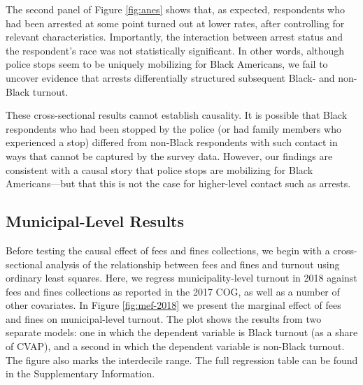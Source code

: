 \documentclass[
  12pt,
]{article}
\begin{document}
The second panel of Figure \ref{fig:anes} shows that, as expected, respondents who had been arrested at some point turned out at lower rates, after controlling for relevant characteristics. Importantly, the interaction between arrest status and the respondent's race was not statistically significant. In other words, although police stops seem to be uniquely mobilizing for Black Americans, we fail to uncover evidence that arrests differentially structured subsequent Black- and non-Black turnout.

These cross-sectional results cannot establish causality. It is possible that Black respondents who had been stopped by the police (or had family members who experienced a stop) differed from non-Black respondents with such contact in ways that cannot be captured by the survey data. However, our findings are consistent with a causal story that police stops are mobilizing for Black Americans---but that this is not the case for higher-level contact such as arrests.

\hypertarget{municipal-level-results}{%
\subsection*{Municipal-Level Results}\label{municipal-level-results}}

Before testing the causal effect of fees and fines collections, we begin with a cross-sectional analysis of the relationship between fees and fines and turnout using ordinary least squares. Here, we regress municipality-level turnout in 2018 against fees and fines collections as reported in the 2017 COG, as well as a number of other covariates. In Figure \ref{fig:mef-2018} we present the marginal effect of fees and fines on municipal-level turnout. The plot shows the results from two separate models: one in which the dependent variable is Black turnout (as a share of CVAP), and a second in which the dependent variable is non-Black turnout. The figure also marks the interdecile range. The full regression table can be found in the Supplementary Information.
\end{document}

